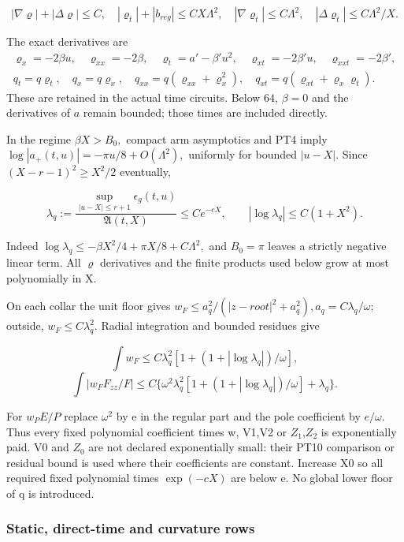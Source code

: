 \[
|\nabla\varrho|+|\Delta\varrho|\le C,\quad
|\varrho_t|+|b_{reg}|\le C X\Lambda^2,\quad
|\nabla\varrho_t|\le C\Lambda^2,\quad
|\Delta\varrho_t|\le C\Lambda^2/X.
\tag{PT12}\label{eq:ansatz-pt12}
\]

The exact derivatives are
\[
\begin{gathered}
\varrho_x=-2\beta u,\quad \varrho_{xx}=-2\beta,\quad
\varrho_t=a'-\beta'u^2,\quad \varrho_{xt}=-2\beta'u,\quad
\varrho_{xxt}=-2\beta',\\
q_t=q\varrho_t,\quad q_x=q\varrho_x,\quad
q_{xx}=q(\varrho_{xx}+\varrho_x^2),\quad
q_{xt}=q(\varrho_{xt}+\varrho_x\varrho_t).
\end{gathered}
\]
These are retained in the actual time circuits. Below $64$, $\beta=0$
and the derivatives of $a$ remain bounded; those times are included directly.

In the regime \(\beta X>B_{0},\) compact arm asymptotics and PT4 imply \(\log|a_+(t,u)|=-\pi u/8+O(\Lambda^{2}),\) uniformly for bounded \(|u-X|.\) Since \((X-r-1)^{2}\ge X^{2}/2\) eventually,

\[
\lambda_q:=\frac{\sup_{|u-X|\le r+1}\epsilon_g(t,u)}
                    {\mathfrak A(t,X)}\le Ce^{-cX},\qquad
|\log\lambda_q|\le C(1+X^2).
\tag{PT13}\label{eq:ansatz-pt13}
\]

Indeed \(\log\lambda_{q}\le -\beta X^{2}/4+\pi X/8+C \Lambda^{2},\) and \(B_{0}=\pi\) leaves a strictly negative linear term. All \(\varrho\) derivatives and the finite products used below grow at most polynomially in X.

On each collar the unit floor gives \(w_{F}\le a_{q}^{2}/(|z-root|^{2}+a_{q}^{2}), a_{q}=C \lambda_{q}/\omega;\) outside, \(w_{F}\le C \lambda_{q}^{2}.\) Radial integration and bounded residues give

\[
\int w_F\le C\lambda_q^2[1+(1+|\log\lambda_q|)/\omega],
\]
\[
\int|w_F F_{zz}/F|\le C\{\omega^2\lambda_q^2
               [1+(1+|\log\lambda_q|)/\omega]+\lambda_q\}.
\tag{PT14}\label{eq:ansatz-pt14}
\]

For \(w_{P} E/P\) replace \(\omega^{2}\) by e in the regular part and the pole coefficient by \(e/\omega.\) Thus every fixed polynomial coefficient times w, V1,V2 or $Z_1$,$Z_2$ is exponentially paid. V0 and $Z_0$ are not declared exponentially small: their PT10 comparison or residual bound is used where their coefficients are constant. Increase X0 so all required fixed polynomial times \(\exp(-cX)\) are below e. No global lower floor of q is introduced.

\subsubsection{Static, direct-time and curvature rows}
\label{subsec:pt-5}


